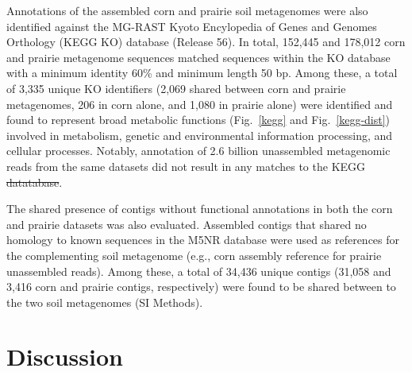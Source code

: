 \documentclass{pnastwo}
\providecommand{\DIFadd}[1]{{\protect\color{blue}\uwave{#1}}} %
\providecommand{\DIFdel}[1]{{\protect\color{red}\sout{#1}}}                      %
\providecommand{\DIFaddbegin}{} %
\providecommand{\DIFaddend}{} %
\providecommand{\DIFdelbegin}{} %
\providecommand{\DIFdelend}{} %
\begin{document}
\begin{article}
Annotations of the assembled corn and prairie soil metagenomes
were also identified against the MG-RAST Kyoto Encylopedia of Genes and Genomes
Orthology (KEGG KO) database (Release 56). In total, 152,445 and 178,012 corn
and prairie metagenome sequences matched sequences within the KO database with a
minimum identity 60\% and minimum length 50 bp. Among these, a total of 3,335
unique KO identifiers (2,069 shared between corn and prairie metagenomes, 206 in
corn alone, and 1,080 in prairie alone) were identified and found to represent
broad metabolic functions (Fig.~\ref{kegg} and Fig.~\ref{kegg-dist}) involved in
metabolism, genetic and environmental information processing, and cellular
processes. Notably, annotation of 2.6 billion unassembled metagenomic reads from the same
datasets did not result in any matches to the KEGG \DIFdelbegin \DIFdel{datatabase}\DIFdelend \DIFaddbegin \DIFadd{database}\DIFaddend . 


The shared presence of contigs without functional annotations in both the corn
and prairie datasets was also evaluated. Assembled contigs that shared no
homology to known sequences in the M5NR database were used as references for the
complementing soil metagenome (e.g., corn assembly reference for prairie
unassembled reads). Among these, a total of 34,436 unique contigs (31,058 and 3,416 corn and prairie contigs, respectively) were found to be shared between to the two soil metagenomes (SI Methods). 

\section*{Discussion}

\end{article}
\end{document}
